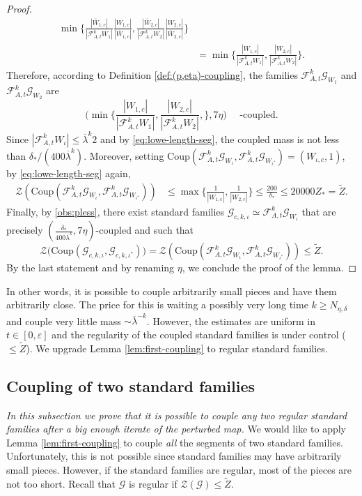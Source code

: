 \documentclass{amsart}
\numberwithin{equation}{section}
\newcommand\ve{\varepsilon}
\renewcommand{\ge}{\geqslant}
\renewcommand{\le}{\leqslant}
\newcommand\cF{{\mathcal F}}
\newcommand\cG{{\mathcal G}}
\newcommand\cZ{{\mathcal Z}}
\newcommand{\catt}{\cF_{A,t}}
\newcommand{\Coup}{\text{Coup}}
\begin{document}
\begin{proof}
\[\begin{split}
\min \biggl\{\frac{|\overline W_{1,c}|}{|\catt^k W_1|}\frac{|W_{1,c}|}{|\overline W_{1,c}|}, \frac{|\overline W_{2,c}|}{|\catt^k W_2|}\frac{|W_{2,c}|}{|\overline W_{2,c}|}\biggr\} \\
&=\min \biggl\{\frac{|W_{1,c}|}{|\catt^k W_1|}, \frac{|W_{2,c}|}{|\catt^k W_2|}\biggr\}.
\end{split}
\]
Therefore, according to Definition \ref{def:(p,eta)-coupling}, the families \(\catt^k\cG_{W_1}\) and \(\catt^k\cG_{ W_2}\) are 
\[
\biggl( \min \biggl\{\frac{|W_{1,c}|}{|\catt^k W_1|}, \frac{|W_{2,c}|}{|\catt^k W_2|},\biggr\} ,7\eta \biggr) \text{ }\text{ }\text{-coupled}.
\]
Since \(|\catt^k W_\iota| \le \overline \lambda^k 2 \) and by \eqref{eq:lowe-length-seg}, the coupled mass is not less than \(\delta_{*}/(400 \overline \lambda^k)\). Moreover, setting \(\Coup (\catt^k\cG_{ W_\iota}, \catt^k\cG_{ W_{\iota^*}}) = (W_{\iota,c}, 1)\), by \eqref{eq:lowe-length-seg} again,
\[
\begin{split}
\cZ\left(\Coup(\catt^k\cG_{ W_\iota}, \catt^k\cG_{ W_{\iota^*}})\right) &\le \max\biggl\{\frac{1}{|W_{1,c}|}, \frac{1}{|W_{2,c}|}\biggr\}\le \frac{200}{\delta_{*}} \le 20000 Z_{*} = \widetilde Z.
\end{split}
\]
Finally, by \ref{obs:pless}, there exist standard families \(\cG_{c,k,\iota} \simeq \catt^k\cG_{W_{\iota}}\) that are precisely \(\left(\frac{\delta_{*}}{400 \overline \lambda^k}, 7\eta \right)\)-coupled and such that
\[
\cZ\bigl(\Coup(\cG_{c,k,\iota}, \cG_{c,k,\iota^{*}})\bigr) = \cZ\left(\Coup (\catt^k\cG_{ W_\iota}, \catt^k\cG_{ W_{\iota^*}})\right) \le \widetilde Z.
\]
By the last statement and by renaming \(\eta\), we conclude the proof of the lemma.
\end{proof}
In other words, it is possible to couple arbitrarily small pieces and have them arbitrarily close. The price for this is waiting a possibly very long time \(k \ge N_{\eta, \delta}\) and couple very little mass \(\sim \overline \lambda^{-k}\). However, the estimates are uniform in \(t \in [0, \ve]\) and the regularity of the coupled standard families is under control (\(\le \widetilde Z\)). We upgrade Lemma \ref{lem:first-coupling} to regular standard families. 

\subsection{Coupling of two standard families}\label{subsec:coupling-sf} \textit{In this subsection we prove that it is possible to couple any two regular standard families after a big enough iterate of the perturbed map.} We would like to apply Lemma \ref{lem:first-coupling} to couple \textit{all} the segments of two standard families. Unfortunately, this is not possible since standard families may have arbitrarily small pieces. However, if the standard families are regular, most of the pieces are not too short. Recall that \(\cG\) is regular if \(\cZ(\cG) \le \widetilde Z\).
\end{document}
